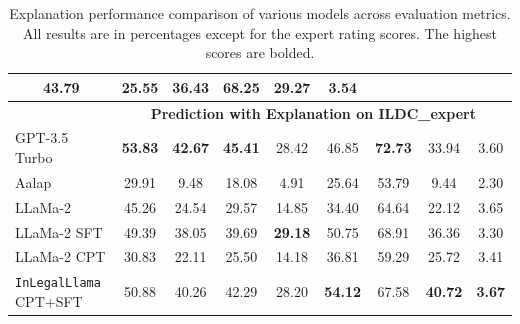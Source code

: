 \begin{table}[t]
{\begin{tabular}{lcccccccc}
  \multicolumn{1}{c}{43.79} &
  \multicolumn{1}{c}{\textbf{25.55}} &
  \multicolumn{1}{c}{\textbf{36.43}} &
  \multicolumn{1}{c}{68.25} &
  \multicolumn{1}{c}{\textbf{29.27}} &
  \textbf{3.54} \\ \midrule%
 &
  \multicolumn{8}{c}{\textbf{Prediction with Explanation on ILDC\_expert \cite{vats-etal-2023-llms, malik-etal-2021-ildc}}} \\\midrule %
GPT-3.5 Turbo &
  \multicolumn{1}{c}{\textbf{53.83}} &
  \multicolumn{1}{c}{\textbf{42.67}} &
  \multicolumn{1}{c}{\textbf{45.41}} &
  \multicolumn{1}{c}{28.42} &
  \multicolumn{1}{c}{46.85} &
  \multicolumn{1}{c}{\textbf{72.73}} &
  \multicolumn{1}{c}{33.94} &
  3.60 \\ %
Aalap &
  \multicolumn{1}{c}{29.91} &
  \multicolumn{1}{c}{9.48} &
  \multicolumn{1}{c}{18.08} &
  \multicolumn{1}{c}{4.91} &
  \multicolumn{1}{c}{25.64} &
  \multicolumn{1}{c}{53.79} &
  \multicolumn{1}{c}{9.44} &
  2.30 \\ %
LLaMa-2 &
  \multicolumn{1}{c}{45.26} &
  \multicolumn{1}{c}{24.54} &
  \multicolumn{1}{c}{29.57} &
  \multicolumn{1}{c}{14.85} &
  \multicolumn{1}{c}{34.40} &
  \multicolumn{1}{c}{64.64} &
  \multicolumn{1}{c}{22.12} &
  3.65 \\ %
LLaMa-2 SFT &
  \multicolumn{1}{c}{49.39} &
  \multicolumn{1}{c}{38.05} &
  \multicolumn{1}{c}{39.69} &
  \multicolumn{1}{c}{\textbf{29.18}} &
  \multicolumn{1}{c}{50.75} &
  \multicolumn{1}{c}{68.91} &
  \multicolumn{1}{c}{36.36} &
  3.30 \\ %
LLaMa-2 CPT &
  \multicolumn{1}{c}{30.83} &
  \multicolumn{1}{c}{22.11} &
  \multicolumn{1}{c}{25.50} &
  \multicolumn{1}{c}{14.18} &
  \multicolumn{1}{c}{36.81} &
  \multicolumn{1}{c}{59.29} &
  \multicolumn{1}{c}{25.72} &
  3.41 \\ %
\texttt{InLegalLlama} CPT+SFT &
  \multicolumn{1}{c}{50.88} &
  \multicolumn{1}{c}{40.26} &
  \multicolumn{1}{c}{42.29} &
  \multicolumn{1}{c}{28.20} &
  \multicolumn{1}{c}{\textbf{54.12}} &
  \multicolumn{1}{c}{67.58} &
  \multicolumn{1}{c}{\textbf{40.72}} &
  \textbf{3.67} \\ \toprule%
\end{tabular}%
}
\caption{Explanation performance comparison of various models across evaluation metrics. All results are in percentages except for the expert rating scores. The highest scores are bolded.}
\label{tab:explanation-table}
\end{table}

